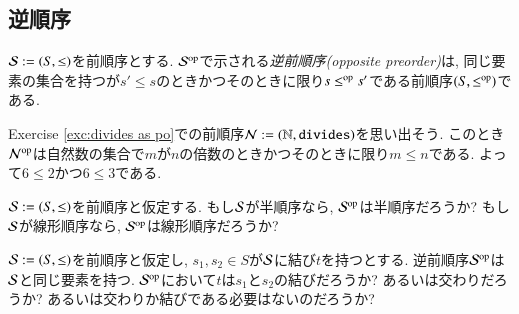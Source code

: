 \subsection{逆順序}

\begin{definition}\label{def:opposite order}

$\mathcal{S}:=(S,\leq)$を前順序とする. $\mcS\op$で示される\emph{逆前順序(opposite preorder)}は, 同じ要素の集合を持つが$s'\leq s$のときかつそのときに限り$s\leq\op s'$である前順序$(S,\leq\op)$である.

\end{definition}

\begin{example}


Exercise \ref{exc:divides as po}での前順序$\mathcal{N}:=({\mathbb N},{\tt divides})$を思い出そう. このとき$\mcN\op$は自然数の集合で$m$が$n$の倍数のときかつそのときに限り$m\leq n$である. よって$6\leq 2$かつ$6\leq 3$である.

\end{example}

\begin{exercise}
$\mathcal{S}:=(S,\leq)$を前順序と仮定する.
\sexc もし$\mathcal{S}$が半順序なら, $\mcS\op$は半順序だろうか?
\next もし$\mathcal{S}$が線形順序なら, $\mcS\op$は線形順序だろうか?
\endsexc
\end{exercise}

\begin{exercise}
$\mathcal{S}:=(S,\leq)$を前順序と仮定し, $s_1,s_2\in S$が$\mathcal{S}$に結び$t$を持つとする. 逆前順序$\mcS\op$は$\mathcal{S}$と同じ要素を持つ. $\mcS\op$において$t$は$s_1$と$s_2$の結びだろうか? あるいは交わりだろうか? あるいは交わりか結びである必要はないのだろうか?
\end{exercise}

